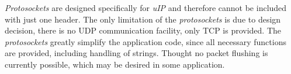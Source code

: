   \emph{Protosockets} are designed specifically for \emph{uIP} and therefore 
 cannot be included with just one header. The only limitation of the
 \emph{protosockets} is due to design decision, there is no UDP communication
 facility, only TCP is provided. The \emph{protosockets} greatly simplify the
 application code, since all necessary functions are provided, including
 handling of strings. Thought no packet flushing is currently possible, which
 may be desired in some application.


